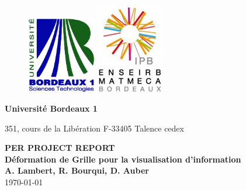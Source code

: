 \begin{titlepage}
  \begin {figure}[ht]
	\includegraphics[angle=0,width=3cm]{img/logobordeaux1.jpg}
        \hspace{11cm}
	\includegraphics[angle=0,width=3cm]{img/logo.jpg}
	\label{logo}
  \end {figure}
  \begin{flushleft}
    \textbf{Université Bordeaux 1}

    351, cours de la Libération 
    F-33405 Talence cedex 
    
  \end{flushleft}
  
  \vspace{4cm}
	\begin{center}
	  {\bf PER PROJECT REPORT}\\
	  \vspace{1cm}
		  {\LARGE\bf Déformation de Grille pour la visualisation d'information}\\
	   \vspace{1cm}
		   {\small\bf A. Lambert, R. Bourqui, D. Auber}\\
\vspace{1cm}
           \today

	\end{center}



\end{titlepage}
